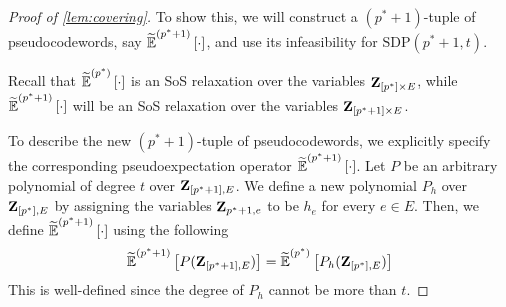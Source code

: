 \begin{proof}[Proof of \cref{lem:covering}]
	To show this, we will construct a $(p^*+1)$-tuple of pseudocodewords, say $\widetilde{\operatorname*{\mathbb{E}}}^{(p^*+1)}\left[ \cdot \right]$, and use its infeasibility for $\mathrm{SDP}(p^*+1,t)$.
	
	Recall that $\widetilde{\operatorname*{\mathbb{E}}}^{(p^*)}\left[ \cdot \right]$ is an SoS relaxation over the variables ${ \mathbf{Z} }_{[p^*] \times E }$,
while $\widetilde{\operatorname*{\mathbb{E}}}^{(p^*+1)}\left[ \cdot \right]$ will be an SoS relaxation over the variables ${ \mathbf{Z} }_{[p^*+1]\times E }$.
	
	To describe the new $(p^*+1)$-tuple of pseudocodewords, we explicitly specify the corresponding pseudoexpectation operator $\widetilde{\operatorname*{\mathbb{E}}}^{(p^*+1)}\left[ \cdot \right]$.
	Let $P$ be an arbitrary polynomial of degree $t$ over ${ \mathbf{Z} }_{[p^*+1], E}$. We define a new polynomial $P_h$ over ${ \mathbf{Z} }_{[p^*], E}$ by assigning the variables ${ \mathbf{Z} }_{p^*+1,e}$ to be $h_e$ for every $e\in E$.
	Then, we define $\widetilde{\operatorname*{\mathbb{E}}}^{(p^*+1)}\left[ \cdot \right]$ using the following
	\[
		\widetilde{\operatorname*{\mathbb{E}}}^{(p^*+1)}\left[ P({ \mathbf{Z} }_{[p^*+1],E}) \right] = \widetilde{\operatorname*{\mathbb{E}}}^{(p^*)}\left[ P_h({ \mathbf{Z} }_{[p^*],E}) \right]
	\]
	This is well-defined since the degree of $P_h$ cannot be more than $t$.
	

\end{proof}
